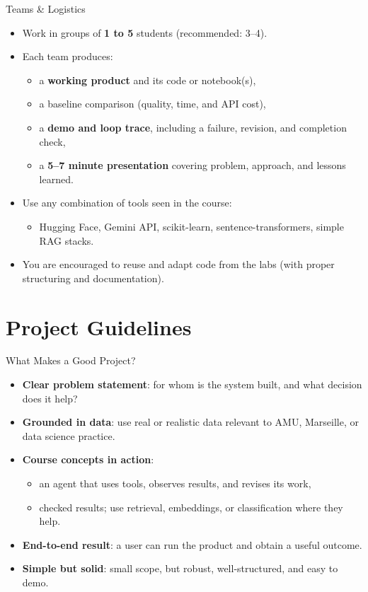 \documentclass[aspectratio=169]{beamer}
\begin{document}
\begin{frame}{Teams \& Logistics}
  \begin{itemize}
    \item Work in groups of \textbf{1 to 5} students (recommended: 3--4).
    \item Each team produces:
      \begin{itemize}
        \item a \textbf{working product} and its code or notebook(s),
        \item a baseline comparison (quality, time, and API cost),
        \item a \textbf{demo and loop trace}, including a failure, revision, and completion check,
        \item a \textbf{5--7 minute presentation} covering problem, approach, and lessons learned.
      \end{itemize}
    \item Use any combination of tools seen in the course:
      \begin{itemize}
        \item Hugging Face, Gemini API, scikit-learn, sentence-transformers, simple RAG stacks.
      \end{itemize}
    \item You are encouraged to reuse and adapt code from the labs (with proper structuring and documentation).
  \end{itemize}
\end{frame}

\section{Project Guidelines}

\begin{frame}{What Makes a Good Project?}
  \begin{itemize}
    \item \textbf{Clear problem statement}: for whom is the system built, and what decision does it help?
    \item \textbf{Grounded in data}: use real or realistic data relevant to AMU, Marseille, or data science practice.
    \item \textbf{Course concepts in action}:
      \begin{itemize}
        \item an agent that uses tools, observes results, and revises its work,
        \item checked results; use retrieval, embeddings, or classification where they help.
      \end{itemize}
    \item \textbf{End-to-end result}: a user can run the product and obtain a useful outcome.
    \item \textbf{Simple but solid}: small scope, but robust, well-structured, and easy to demo.
  \end{itemize}
\end{frame}
\end{document}
